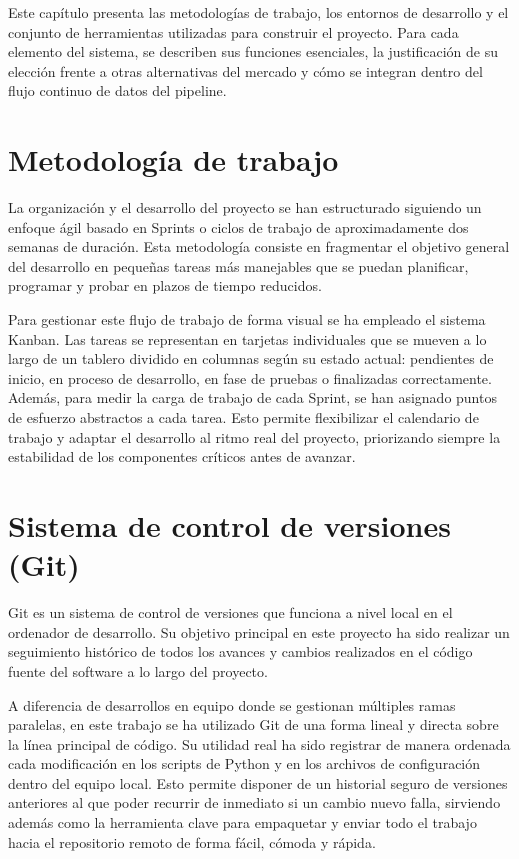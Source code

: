 
Este capítulo presenta las metodologías de trabajo, los entornos de desarrollo y el conjunto de herramientas utilizadas para construir el proyecto. Para cada elemento del sistema, se describen sus funciones esenciales, la justificación de su elección frente a otras alternativas del mercado y cómo se integran dentro del flujo continuo de datos del pipeline.

\section{Metodología de trabajo}
La organización y el desarrollo del proyecto se han estructurado siguiendo un enfoque ágil basado en Sprints o ciclos de trabajo de aproximadamente dos semanas de duración. Esta metodología consiste en fragmentar el objetivo general del desarrollo en pequeñas tareas más manejables que se puedan planificar, programar y probar en plazos de tiempo reducidos. 

Para gestionar este flujo de trabajo de forma visual se ha empleado el sistema Kanban. Las tareas se representan en tarjetas individuales que se mueven a lo largo de un tablero dividido en columnas según su estado actual: pendientes de inicio, en proceso de desarrollo, en fase de pruebas o finalizadas correctamente. Además, para medir la carga de trabajo de cada Sprint, se han asignado puntos de esfuerzo abstractos a cada tarea. Esto permite flexibilizar el calendario de trabajo y adaptar el desarrollo al ritmo real del proyecto, priorizando siempre la estabilidad de los componentes críticos antes de avanzar.

\section{Sistema de control de versiones (Git)}
Git es un sistema de control de versiones que funciona a nivel local en el ordenador de desarrollo. Su objetivo principal en este proyecto ha sido realizar un seguimiento histórico de todos los avances y cambios realizados en el código fuente del software a lo largo del proyecto.

A diferencia de desarrollos en equipo donde se gestionan múltiples ramas paralelas, en este trabajo se ha utilizado Git de una forma lineal y directa sobre la línea principal de código. Su utilidad real ha sido registrar de manera ordenada cada modificación en los scripts de Python y en los archivos de configuración dentro del equipo local. Esto permite disponer de un historial seguro de versiones anteriores al que poder recurrir de inmediato si un cambio nuevo falla, sirviendo además como la herramienta clave para empaquetar y enviar todo el trabajo hacia el repositorio remoto de forma fácil, cómoda y rápida.

